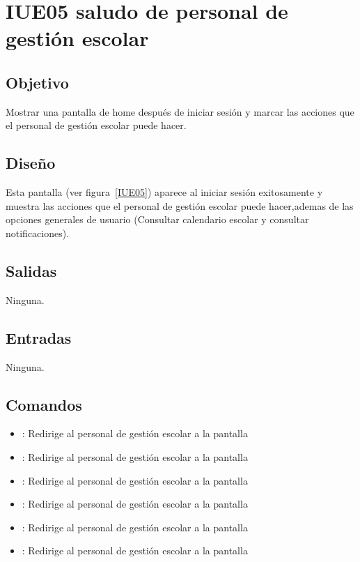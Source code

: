 \section{IUE05 saludo de personal de gestión escolar}

\subsection{Objetivo}
Mostrar una pantalla de home después de iniciar sesión y marcar las acciones que el personal de gestión escolar puede hacer.

\subsection{Diseño}
Esta pantalla  (ver figura~\ref{IUE05}) aparece al iniciar sesión exitosamente y muestra las acciones que el personal de gestión escolar puede hacer,ademas de las opciones generales de usuario (Consultar calendario escolar y consultar notificaciones). 


\subsection{Salidas}

Ninguna.

\subsection{Entradas}
Ninguna.

\subsection{Comandos}
\begin{itemize}
	\item {}: Redirige al personal de gestión escolar a la pantalla 
	\item {}: Redirige al personal de gestión escolar a la pantalla 
	\item {}: Redirige al personal de gestión escolar a la pantalla 
	\item {}: Redirige al personal de gestión escolar a la pantalla 
	\item {}: Redirige al personal de gestión escolar a la pantalla 
	\item {}: Redirige al personal de gestión escolar a la pantalla 
	
\end{itemize}


